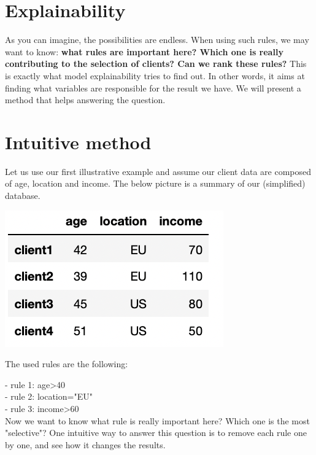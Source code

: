 \section{Explainability}

\label{sec:explainability}

As you can imagine, the possibilities are endless. When using such rules, we may want to know: \textbf{what rules are important here? Which one is really contributing to the selection of clients? Can we rank these rules?} This is exactly what model explainability tries to find out. In other words, it aims at finding what variables are responsible for the result we have. We will present a method that helps answering the question. \\

\section{Intuitive method}

\label{sec:intuitive-method}

Let us use our first illustrative example and assume our client data are composed of age, location and income. The below picture is a summary of our (simplified) database. 

\begin{center}
\includegraphics[scale=0.3]{data-simple-example.png}
\end{center}

The used rules are the following:

- rule 1: age>40 \\
- rule 2: location="EU" \\
- rule 3: income>60 \\

Now we want to know what rule is really important here? Which one is the most "selective"? One intuitive way to answer this question is to remove each rule one by one, and see how it changes the results. \\


